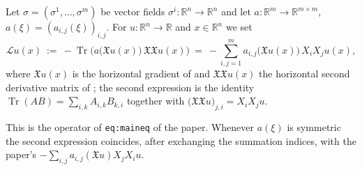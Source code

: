 \begin{definition}
Let $\sigma=(\sigma^1,\dots,\sigma^m)$ be vector fields $\sigma^i:\mathbb{R}^n\to\mathbb{R}^n$ and
let $a:\mathbb{R}^m\to\mathbb{R}^{m\times m}$, $a(\xi)=(a_{i,j}(\xi))_{i,j}$. For
$u:\mathbb{R}^n\to\mathbb{R}$ and $x\in\mathbb{R}^n$ we set
$$\mathcal{L}u(x)\ :=\ -\operatorname{Tr}\Big(a\big(\mathfrak{X}u(x)\big)\,
\mathfrak{X}\mathfrak{X}u(x)\Big)\ =\ -\sum_{i,j=1}^m
a_{i,j}\big(\mathfrak{X}u(x)\big)\,X_iX_ju(x),$$
where $\mathfrak{X}u(x)$ is the horizontal gradient of  and
$\mathfrak{X}\mathfrak{X}u(x)$ the horizontal second derivative matrix of ; the
second expression is the identity $\operatorname{Tr}(AB)=\sum_{i,k}A_{i,k}B_{k,i}$ together with
$\big(\mathfrak{X}\mathfrak{X}u\big)_{j,i}=X_iX_ju$.

This is the operator of \texttt{eq:maineq} of the paper. Whenever $a(\xi)$ is symmetric the second
expression coincides, after exchanging the summation indices, with the paper's
$-\sum_{i,j}a_{i,j}(\mathfrak{X}u)X_jX_iu$.
\end{definition}
